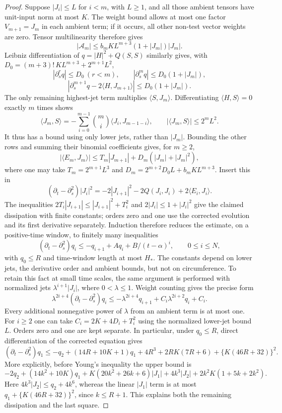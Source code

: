 \begin{proof}
Suppose $|J_i|\le L$ for $i<m$, with $L\ge1$, and all those
ambient tensors have unit-input norm at most $K$.
The weight bound allows at most one factor $V_{m+1}=J_m$
in each ambient term; if it occurs, all other non-test vector
weights are zero.  Tensor multilinearity therefore gives
\[
 |\mathcal A_m|\le b_m K L^{m+3}(1+|J_m|)|J_m|.
\]
Leibniz differentiation of $q=|H|^2+Q(S,S)$ similarly gives,
with $D_0=(m+3)!\,K L^{m+3}+2^{m+1}L^2$,
\[
 |\partial_s^r q|\le D_0\ (r<m),\qquad
 |\partial_s^m q|\le D_0(1+|J_m|),
\]
\[
 |\partial_s^{m+1}q-2\langle H,J_{m+1}\rangle|
                                  \le D_0(1+|J_m|).
\]
The only remaining highest-jet term multiplies
$\langle S,J_m\rangle$.  Differentiating
$\langle H,S\rangle=0$ exactly $m$ times shows
\[
 \langle J_m,S\rangle
   =-\sum_{i=0}^{m-1}\binom mi\langle J_i,J_{m-1-i}\rangle,
 \qquad |\langle J_m,S\rangle|\le2^m L^2.
\]
It thus has a bound using only lower jets, rather than
$|J_m|$.  Bounding the other rows and summing their binomial
coefficients gives, for $m\ge2$,
\[
 |\langle E_m,J_m\rangle|
       \leq T_m|J_{m+1}|+D_m(|J_m|+|J_m|^2),
\]
where one may take
$T_m=2^{m+1}L^3$ and
$D_m=2^{m+2}D_0L+b_mKL^{m+3}$.
Insert this in
\[
 (\partial_t-\partial_s^2)|J_i|^2
       =-2|J_{i+1}|^2-2Q(J_i,J_i)+2\langle E_i,J_i\rangle.
\]
The inequalities $2T_i|J_{i+1}|\leq|J_{i+1}|^2+T_i^2$ and
$2|J_i|\leq1+|J_i|^2$ give the claimed dissipation with finite
constants; orders zero and one use the corrected evolution and its first
derivative separately.  Induction therefore reduces the estimate,
on a positive-time window, to finitely many inequalities
\[
 (\partial_t-\partial_s^2)q_i
       \leq-q_{i+1}+Aq_i+B/(t-\alpha)^i,\qquad 0\leq i\leq N,
\]
with $q_0\leq R$ and time-window length at most $H_*$.
The constants depend on lower jets, the derivative order and ambient
bounds, but not on circumference.  To retain this fact at small
time scales, the same argument is performed with normalized
jets $\lambda^{i+1}|J_i|$, where $0<\lambda\le1$.
Weight counting gives the precise form
\[
 \lambda^{2i+4}(\partial_t-\partial_s^2)q_i
 \le-\lambda^{2i+4}q_{i+1}
                      +C_i\lambda^{2i+2}q_i+C_i.
\]
Every additional nonnegative power of $\lambda$ from an
ambient term is at most one.  For $i\ge2$ one can take
$C_i=2K+4D_i+T_i^2$ using the normalized lower-jet bound $L$.
Orders zero and one are kept separate.  In particular, under
$q_0\le R$, direct differentiation of the corrected equation gives
\[
 (\partial_t-\partial_s^2)q_1
 \le-q_2+(14R+10K+1)q_1+
       4R^3+2RK(7R+6)+\{K(46R+32)\}^2.
\]
More explicitly, before Young's inequality the upper bound is
\[
 -2q_2+(14k^2+10K)q_1
 +K(20k^2+26k+6)|J_1|+4k^3|J_2|
 +2k^2K(1+5k+2k^2).
\]
Here $4k^3|J_2|\leq q_2+4k^6$, whereas the linear
$|J_1|$ term is at most
$q_1+\{K(46R+32)\}^2$, since $k\leq R+1$.
This explains both the remaining dissipation and the last square.


\end{proof}
